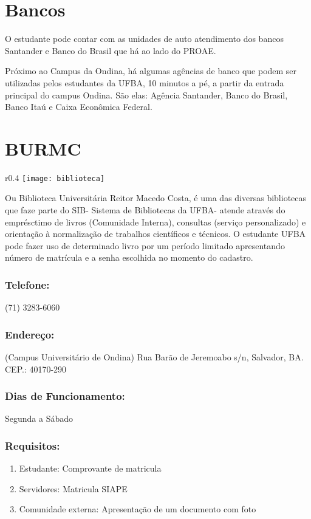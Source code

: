 \section{Bancos}
     O estudante pode contar com as unidades de auto atendimento dos bancos Santander e Banco do Brasil que há ao lado do PROAE.
     
     Próximo ao Campus da Ondina, há algumas agências de banco que podem ser utilizadas pelos estudantes da UFBA, 10 minutos a pé, a partir da entrada principal do campus Ondina. São elas: Agência Santander, Banco do Brasil, Banco Itaú e Caixa Econômica Federal.
      
\section{BURMC}

    \begin{wrapfigure}{r}{0.4\textwidth}
        \centering
        \texttt{[image: biblioteca]}
    \end{wrapfigure}

    
    Ou Biblioteca Universitária Reitor Macedo Costa,  é uma das diversas bibliotecas que faze parte do SIB- Sistema de Bibliotecas da UFBA- atende através do emprésctimo de livros (Comunidade Interna), consultas  (serviço personalizado) e orientação à normalização de trabalhos científicos e técnicos. O estudante UFBA pode fazer uso de determinado livro por um período limitado apresentando número de matrícula e a senha escolhida no momento do cadastro.

        \subsubsection{Telefone:}
            (71) 3283-6060 
        
        \subsubsection{Endereço:}
            (Campus Universitário de Ondina) Rua Barão de Jeremoabo s/n,  Salvador, BA.
            CEP.: 40170-290
            
        \subsubsection{Dias de Funcionamento:}
            Segunda a Sábado
            
        \subsubsection{Requisitos:}
            \begin{enumerate}
                \item  Estudante: Comprovante de matricula
                \item Servidores: Matricula SIAPE
                \item Comunidade externa: Apresentação de um documento com foto
            \end{enumerate}
